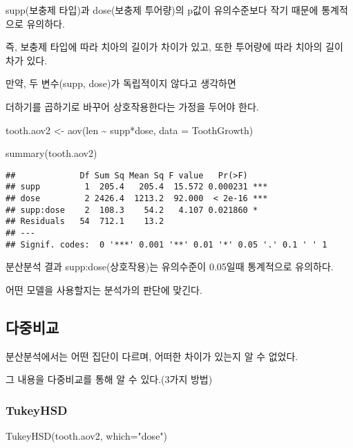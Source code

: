 \documentclass[
]{article}
\newenvironment{Shaded}{\begin{snugshade}}{\end{snugshade}}
\newcommand{\AttributeTok}[1]{\textcolor[rgb]{0.77,0.63,0.00}{#1}}
\newcommand{\FunctionTok}[1]{\textcolor[rgb]{0.00,0.00,0.00}{#1}}
\newcommand{\NormalTok}[1]{#1}
\newcommand{\OtherTok}[1]{\textcolor[rgb]{0.56,0.35,0.01}{#1}}
\newcommand{\SpecialCharTok}[1]{\textcolor[rgb]{0.00,0.00,0.00}{#1}}
\newcommand{\StringTok}[1]{\textcolor[rgb]{0.31,0.60,0.02}{#1}}
\begin{document}
supp(보충제 타입)과 dose(보충제 투어량)의 p값이 유의수준보다 작기 때문에 통계적으로 유의하다.

즉, 보충제 타입에 따라 치아의 길이가 차이가 있고, 또한 투어량에 따라 치아의 길이 차가 있다.

만약, 두 변수(supp, dose)가 독립적이지 않다고 생각하면

더하기를 곱하기로 바꾸어 상호작용한다는 가정을 두어야 한다.

\begin{Shaded}
\begin{Highlighting}[]
\NormalTok{tooth.aov2 }\OtherTok{\textless{}{-}} \FunctionTok{aov}\NormalTok{(len }\SpecialCharTok{\textasciitilde{}}\NormalTok{ supp}\SpecialCharTok{*}\NormalTok{dose, }\AttributeTok{data =}\NormalTok{ ToothGrowth)}

\FunctionTok{summary}\NormalTok{(tooth.aov2)}
\end{Highlighting}
\end{Shaded}

\begin{verbatim}
##             Df Sum Sq Mean Sq F value   Pr(>F)    
## supp         1  205.4   205.4  15.572 0.000231 ***
## dose         2 2426.4  1213.2  92.000  < 2e-16 ***
## supp:dose    2  108.3    54.2   4.107 0.021860 *  
## Residuals   54  712.1    13.2                     
## ---
## Signif. codes:  0 '***' 0.001 '**' 0.01 '*' 0.05 '.' 0.1 ' ' 1
\end{verbatim}

분산분석 결과 supp:dose(상호작용)는 유의수준이 0.05일때 통계적으로 유의하다.

어떤 모델을 사용할지는 분석가의 판단에 맞긴다.

\hypertarget{uxb2e4uxc911uxbe44uxad50-1}{%
\subsection{다중비교}\label{uxb2e4uxc911uxbe44uxad50-1}}

분산분석에서는 어떤 집단이 다르며, 어떠한 차이가 있는지 알 수 없었다.

그 내용을 다중비교를 통해 알 수 있다.(3가지 방법)

\hypertarget{tukeyhsd-1}{%
\subsubsection{TukeyHSD}\label{tukeyhsd-1}}

\begin{Shaded}
\begin{Highlighting}[]
\FunctionTok{TukeyHSD}\NormalTok{(tooth.aov2, }\AttributeTok{which=}\StringTok{"dose"}\NormalTok{)}
\end{Highlighting}
\end{Shaded}
\end{document}

